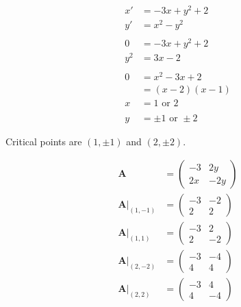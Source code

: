 \documentclass{article}
\begin{document}
\begin{align*}
  x'  & = -3 x + y^2 + 2          \\
  y'  & = x^2 - y^2               \\ \\
  0   & = -3 x + y^2 + 2          \\
  y^2 & = 3 x - 2                 \\ \\
  0   & = x^2 - 3 x + 2           \\
      & = (x - 2) (x - 1)         \\
  x   & = 1 \text{ or } 2         \\ \\
  y   & = \pm 1 \text{ or } \pm 2
\end{align*}

Critical points are $(1, \pm 1)$ and $(2, \pm 2)$.

\begin{align*}
  \mathbf{A}                          & = \begin{pmatrix}
                                            -3  & 2 y  \\
                                            2 x & -2 y
                                          \end{pmatrix} \\
  \left. \mathbf{A} \right|_{(1, -1)} & = \begin{pmatrix}
                                            -3 & -2 \\
                                            2  & 2
                                          \end{pmatrix} \\
  \left. \mathbf{A} \right|_{(1, 1)}  & = \begin{pmatrix}
                                            -3 & 2  \\
                                            2  & -2
                                          \end{pmatrix} \\
  \left. \mathbf{A} \right|_{(2, -2)} & = \begin{pmatrix}
                                            -3 & -4 \\
                                            4  & 4
                                          \end{pmatrix} \\
  \left. \mathbf{A} \right|_{(2, 2)}  & = \begin{pmatrix}
                                            -3 & 4  \\
                                            4  & -4
                                          \end{pmatrix} \\
\end{align*}
\end{document}
